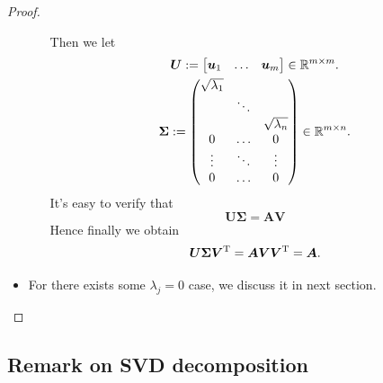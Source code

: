 \begin{proof}
\begin{itemize}
\begin{itemize}
Then we let
\begin{gather*}
\bm U:=\begin{bmatrix}
\bm u_1&\dots&\bm u_m
\end{bmatrix}\in\mathbb{R}^{m\times m}.\\
\bm\Sigma:=\begin{pmatrix}
\sqrt{\lambda_1}&&\\&\ddots&\\&&\sqrt{\lambda_n}\\
0&\dots&0\\\vdots&\ddots&\vdots\\0&\dots&0
\end{pmatrix}\in\mathbb{R}^{m\times n}.
\end{gather*}
It's easy to verify that 
\[
\bm U\bm\Sigma=\bm{AV}
\]
Hence finally we obtain
\[
\bm U\bm\Sigma\bm V^{\mathrm T}=\bm A\bm V\bm V^{\mathrm T}=\bm A.
\]
\end{itemize}
\item
For there exists some $\lambda_j=0$ case, we discuss it in next section.
\end{itemize}
\end{proof}
\subsection{Remark on SVD decomposition}
